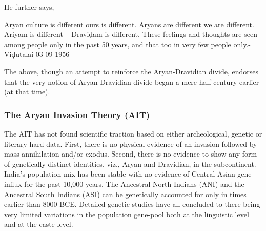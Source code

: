 He further says,

\begin{myquote}
Aryan culture is different ours is different. Aryans are different we are different. Ariyam is different – Draviḍam is different. These feelings and thoughts are seen among people only in the past 50 years, and that too in very few people only.\hfill - Viḍutalai 03-09-1956
\end{myquote}

The above, though an attempt to reinforce the Aryan-Dravidian divide, endorses that the very notion of Aryan-Dravidian divide began a mere half-century earlier (at that time).


\subsubsection{The Aryan Invasion Theory (AIT)}

The AIT has not found scientific traction based on either archeological, genetic or literary hard data. First, there is no physical evidence of an invasion followed by mass annihilation and/or exodus. Second, there is no evidence to show any form of genetically distinct identities, viz., Aryan and Dravidian, in the subcontinent. India’s population mix has been stable with no evidence of Central Asian gene influx for the past 10,000 years. The Ancestral North Indians (ANI) and the Ancestral South Indians (ASI) can be genetically accounted for only in times earlier than 8000 BCE. Detailed genetic studies have all concluded to there being very limited variations in the population gene-pool both at the linguistic level and at the caste level.

